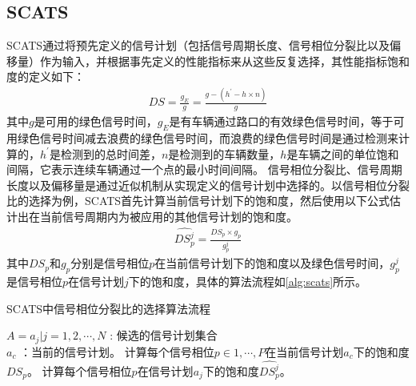 \subsection{SCATS}
SCATS\cite{lowrie1990scats}通过将预先定义的信号计划（包括信号周期长度、信号相位分裂比以及偏移量）作为输入，并根据事先定义的性能指标来从这些反复选择，其性能指标饱和度的定义如下：
\begin{align}
    D S=\frac{g_E}{g}=\frac{g-\left(h^{\prime}-h \times n\right)}{g}
\end{align}
其中$g$是可用的绿色信号时间，$g_E$是有车辆通过路口的有效绿色信号时间，等于可用绿色信号时间减去浪费的绿色信号时间，而浪费的绿色信号时间是通过检测来计算的，$h^{\prime}$是检测到的总时间差，$n$是检测到的车辆数量，$h$是车辆之间的单位饱和间隔，它表示连续车辆通过一个点的最小时间间隔。
信号相位分裂比、信号周期长度以及偏移量是通过近似机制从实现定义的信号计划中选择的。以信号相位分裂比的选择为例，SCATS首先计算当前信号计划下的饱和度，然后使用以下公式估计出在当前信号周期内为被应用的其他信号计划的饱和度。
\begin{align}
    \hat{D S^j_p} = \frac{D S_p \times g_p}{g_p^j}
\end{align}
其中$D S_p\text{和} g_p$分别是信号相位$p$在当前信号计划下的饱和度以及绿色信号时间，$g^j_p$是信号相位$p$在信号计划$j$下的饱和度，具体的算法流程如\autoref{alg:scats}所示。
\begin{breakablealgorithm}
    \caption{SCATS中信号相位分裂比的选择算法流程}
    \label{alg:scats}
    \begin{algorithmic}[1] %
        \Require 
        $A={a_j|j=1,2,\cdots,N}$ : 候选的信号计划集合\\
        $a_c$ ：当前的信号计划。 
            \State 计算每个信号相位$p\in{1,\cdots, P}$在当前信号计划$a_c$下的饱和度$D S_{p}$。
        \EndFor
            \State 计算每个信号相位$p$在信号计划$a_j$下的饱和度$\hat{D S^j_p}$。
        \EndFor
    \end{algorithmic}  
\end{breakablealgorithm}  

